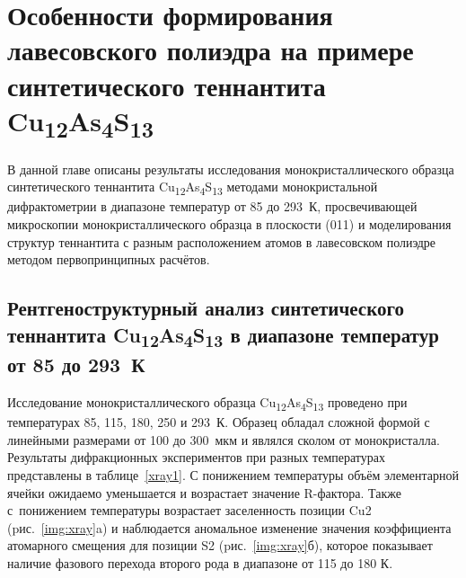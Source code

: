 \chapter{Особенности формирования лавесовского полиэдра на примере синтетического теннантита Cu\textsubscript{12}As\textsubscript{4}S\textsubscript{13}} \label{chapt3}

В данной главе описаны результаты исследования монокристаллического образца синтетического теннантита Cu\textsubscript{12}As\textsubscript{4}S\textsubscript{13} методами монокристальной дифрактометрии в диапазоне температур от 85 до 293~К, просвечивающей микроскопии монокристаллического образца в плоскости (011) и моделирования структур теннантита с разным расположением атомов в лавесовском полиэдре методом первопринципных расчётов.



\section{Рентгеноструктурный анализ синтетического теннантита Cu\textsubscript{12}As\textsubscript{4}S\textsubscript{13} в диапазоне температур от 85 до 293~К} \label{sect3_1}

Исследование монокристаллического образца  Cu\textsubscript{12}As\textsubscript{4}S\textsubscript{13} проведено при температурах 85, 115, 180, 250 и 293~К. Образец обладал сложной формой с линейными размерами от 100 до 300~мкм и являлся сколом от монокристалла.  Результаты дифракционных экспериментов при разных температурах представлены в таблице~\ref{xray1}. С понижением температуры объём элементарной ячейки ожидаемо уменьшается и возрастает значение R-фактора.
Также с~понижением температуры возрастает заселенность позиции Cu2 (pис.~\ref{img:xray}a) и  наблюдается аномальное изменение значения коэффициента атомарного смещения для позиции S2 (pис.~\ref{img:xray}б), которое показывает наличие фазового перехода второго рода в диапазоне от 115 до 180 К.

